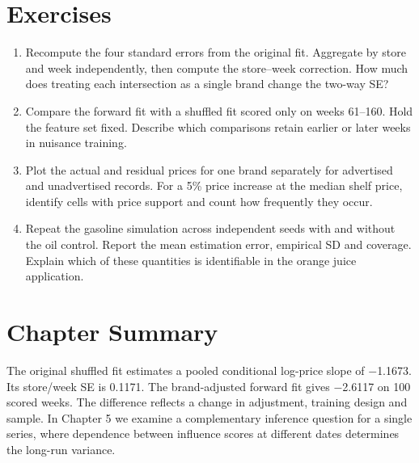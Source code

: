 \section{Exercises}\label{sec:ch04_exercises}

\begin{enumerate}
\def\labelenumi{\arabic{enumi}.}
\item
  Recompute the four standard errors from the original fit. Aggregate by store and week independently, then compute the store--week correction. How much does treating each intersection as a single brand change the two-way SE?
\item
  Compare the forward fit with a shuffled fit scored only on weeks 61--160. Hold the feature set fixed. Describe which comparisons retain earlier or later weeks in nuisance training.
\item
  Plot the actual and residual prices for one brand separately for advertised and unadvertised records. For a 5\% price increase at the median shelf price, identify cells with price support and count how frequently they occur.
\item
  Repeat the gasoline simulation across independent seeds with and without the oil control. Report the mean estimation error, empirical SD and coverage. Explain which of these quantities is identifiable in the orange juice application.
\end{enumerate}

\section{Chapter Summary}\label{sec:ch04_summary}

The original shuffled fit estimates a pooled conditional log-price slope of \ensuremath{-}1.1673. Its store/week SE is 0.1171. The brand-adjusted forward fit gives \ensuremath{-}2.6117 on 100 scored weeks. The difference reflects a change in adjustment, training design and sample. In Chapter 5 we examine a complementary inference question for a single series, where dependence between influence scores at different dates determines the long-run variance.
